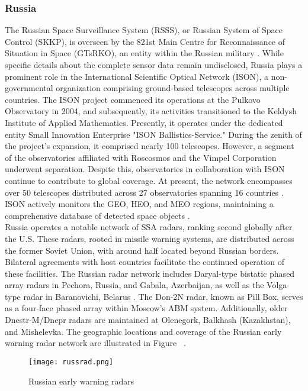 \subsubsection{Russia}

The Russian Space Surveillance System (RSSS), or Russian System of Space Control (SKKP), is overseen by the 821st Main Centre for Reconnaissance of Situation in Space (GTsRKO), an entity within the Russian military \cite{dia}. While specific details about the complete sensor data remain undisclosed, Russia plays a prominent role in the International Scientific Optical Network (ISON), a non-governmental organization comprising ground-based telescopes across multiple countries. The ISON project commenced its operations at the Pulkovo Observatory in 2004, and subsequently, its activities transitioned to the Keldysh Institute of Applied Mathematics. Presently, it operates under the dedicated entity Small Innovation Enterprise "ISON Ballistics-Service." During the zenith of the project's expansion, it comprised nearly 100 telescopes. However, a segment of the observatories affiliated with Roscosmos and the Vimpel Corporation underwent separation. Despite this, observatories in collaboration with ISON continue to contribute to global coverage. At present, the network encompasses over 50 telescopes distributed across 27 observatories spanning 16 countries \cite{russ}. ISON actively monitors the GEO, HEO, and MEO regions, maintaining a comprehensive database of detected space objects \cite{russ}.\\

Russia operates a notable network of SSA radars, ranking second globally after the U.S. These radars, rooted in missile warning systems, are distributed across the former Soviet Union, with around half located beyond Russian borders. Bilateral agreements with host countries facilitate the continued operation of these facilities. The Russian radar network includes Daryal-type bistatic phased array radars in Pechora, Russia, and Gabala, Azerbaijan, as well as the Volga-type radar in Baranovichi, Belarus \cite{povel}. The Don-2N radar, known as Pill Box, serves as a four-face phased array within Moscow's ABM system. Additionally, older Dnestr-M/Dnepr radars are maintained at Olenegork, Balkhash (Kazakhstan), and Mishelevka. The geographic locations and coverage of the Russian early warning radar network are illustrated in Figure~ \cite{povel,weeden}.\\

\begin{figure}[h!]
	\centering
	\texttt{[image: russrad.png]}
	\caption{Russian early warning radars \cite{povel}}\label{fig:pov}
\end{figure}


